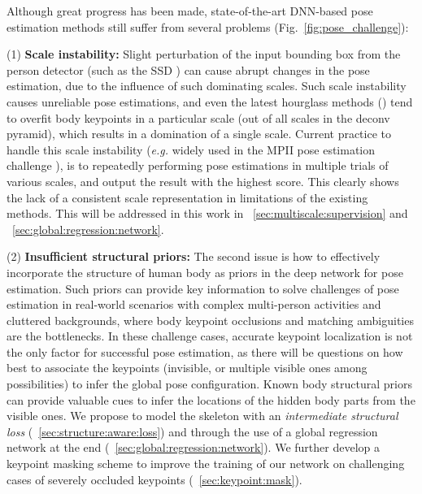 \documentclass[runningheads]{llncs}
\begin{document}
Although great progress has been made, state-of-the-art DNN-based pose estimation methods still suffer from several problems (Fig.~\ref{fig:pose_challenge}):

\noindent (1) {\bf Scale instability:} Slight perturbation of the input bounding box from the person detector (such as the SSD \cite{liu2016ssd}) can cause abrupt changes in the pose estimation, due to the influence of such dominating scales. Such scale instability causes unreliable pose estimations, and even the latest hourglass methods (\cite{chu2017multi,yang2017learning}) tend to overfit body keypoints in a particular scale (out of all scales in the deconv pyramid), which results in a domination of a single scale. Current practice to handle this scale instability ({\em e.g.} widely used in the MPII pose estimation challenge \cite{andriluka14cvpr}), is to repeatedly performing pose estimations in multiple trials of various scales, and output the result with the highest score. This clearly shows the lack of a consistent scale representation in limitations of the existing methods. This will be addressed in this work in ~\ref{sec:multiscale:supervision} and ~\ref{sec:global:regression:network}. 


\noindent (2) {\bf Insufficient structural priors:} The second issue is how to effectively incorporate the structure of human body as priors in the deep network for pose estimation. 
Such priors can provide key information to solve challenges of pose estimation in real-world scenarios with complex multi-person activities and cluttered backgrounds, where body keypoint occlusions and matching ambiguities are the bottlenecks.
In these challenge cases, accurate keypoint localization is not the only factor for successful pose estimation, as there will be questions on how best to associate the keypoints (invisible, or multiple visible ones among possibilities) to infer the global pose configuration. Known body structural priors can provide valuable cues to infer the locations of the hidden body parts from the visible ones.
We propose to model the skeleton
with an {\em intermediate structural loss} (~\ref{sec:structure:aware:loss}) and through the use of a global regression network at the end (~\ref{sec:global:regression:network}).
We further develop a keypoint masking scheme to improve the training of our network on challenging cases of severely occluded keypoints  (~\ref{sec:keypoint:mask}).
 
\end{document}
